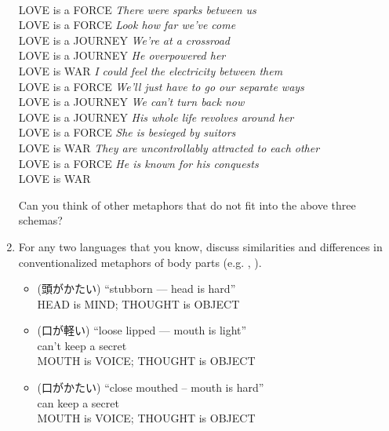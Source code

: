 \documentclass[a4paper]{article}
\begin{document}
\begin{enumerate}
\begin{exe}
  \\  LOVE is a FORCE
  \ex \textit{There were sparks between us}
  \\  LOVE is a FORCE
  \ex \textit{Look how far we've come}
  \\  LOVE is a JOURNEY
\ex \textit{We're at a crossroad}
  \\  LOVE is a JOURNEY
  \ex \textit{He overpowered her}
  \\ LOVE is WAR
\ex \textit{I could feel the electricity between them}
  \\  LOVE is a FORCE
\ex \textit{We'll just have to go our separate ways}
  \\  LOVE is a JOURNEY
\ex \textit{We can't turn back now}
  \\  LOVE is a JOURNEY
\ex \textit{His whole life revolves around her}
  \\  LOVE is a FORCE
\ex \textit{She is besieged by suitors}
  \\ LOVE is WAR
\ex \textit{They are uncontrollably attracted to each other}
  \\  LOVE is a FORCE
\ex \textit{He is known for his conquests}
  \\ LOVE is WAR
\end{exe}
Can you think of other metaphors that do not fit into the above three schemas?

\item For any two languages that you know, discuss similarities and
  differences in conventionalized metaphors of body parts
  (e.g. , ).
  \begin{itemize}
  \item {} (頭がかたい) ``stubborn --- head is hard''
    \\ HEAD is MIND; THOUGHT is OBJECT
  \item {} (口が軽い) ``loose lipped --- mouth is
    light''
    \\ can't keep a secret
    \\ MOUTH is VOICE; THOUGHT is OBJECT
  \item {} (口がかたい) ``close mouthed --  mouth is
    hard''
    \\ can keep a secret
    \\ MOUTH is VOICE; THOUGHT is OBJECT


\end{itemize}
\end{enumerate}
\end{document}
